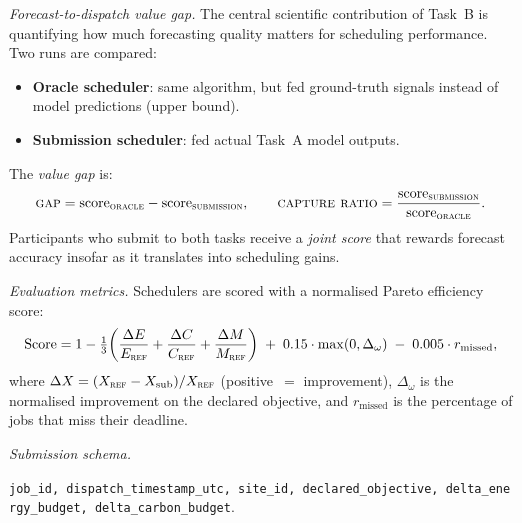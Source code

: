 \medskip
\noindent\textit{Forecast-to-dispatch value gap.}
The central scientific contribution of Task~B is quantifying how much
forecasting quality matters for scheduling performance.
Two runs are compared:
\begin{itemize}
  \item \textbf{Oracle scheduler}: same algorithm, but fed ground-truth
        signals instead of model predictions (upper bound).
  \item \textbf{Submission scheduler}: fed actual Task~A model outputs.
\end{itemize}
The \emph{value gap} is:
\[
  \textsc{gap} = \text{score}_{\textsc{oracle}} - \text{score}_{\textsc{submission}},
  \qquad
  \textsc{capture ratio} =
    \frac{\text{score}_{\textsc{submission}}}{\text{score}_{\textsc{oracle}}}.
\]
Participants who submit to both tasks receive a \emph{joint score} that rewards
forecast accuracy insofar as it translates into scheduling gains.

\medskip
\noindent\textit{Evaluation metrics.}
Schedulers are scored with a normalised Pareto efficiency score:
\[
  \text{Score}
  = 1 - \tfrac{1}{3}\!\left(
      \frac{\Delta E}{E_{\textsc{ref}}} +
      \frac{\Delta C}{C_{\textsc{ref}}} +
      \frac{\Delta M}{M_{\textsc{ref}}}
    \right)
  \;+\; 0.15 \cdot \max(0, \Delta_\omega)
  \;-\; 0.005 \cdot r_{\text{missed}},
\]
where $\Delta X = (X_{\textsc{ref}} - X_{\text{sub}}) / X_{\textsc{ref}}$
(positive~$=$ improvement), $\Delta_\omega$ is the normalised improvement on
the declared objective, and $r_{\text{missed}}$ is the percentage of jobs
that miss their deadline.

\medskip
\noindent\textit{Submission schema.}
\begin{center}
  \texttt{job\_id,\ dispatch\_timestamp\_utc,\ site\_id,\
          declared\_objective,\ delta\_energy\_budget,\ delta\_carbon\_budget}.
\end{center}


